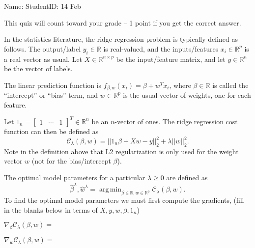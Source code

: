 \documentclass[12pt]{article}
\DeclareMathOperator*{\argmin}{arg\,min}
\begin{document}
\thispagestyle{empty}

Name: \underline{\hspace{2in}} StudentID: \underline{\hspace{2in}} 14 Feb

This quiz will count toward your grade -- 1 point if you get the
correct answer.

In the statistics literature, the ridge regression problem is
typically defined as follows. The
output/label $ y_i\in\mathbb R$ is real-valued, and the
inputs/features $x_i\in\mathbb R^p$ is a real vector as usual.
Let $X\in \mathbb R^{n\times p}$ be the input/feature matrix, and let
$ y\in\mathbb R^n$ be the vector of labels. 

The linear prediction function is
$f_{\beta,w}(x_i) = \beta + w^T x_i$, where $\beta\in\mathbb R$ is
called the ``intercept'' or ``bias'' term, and $w\in\mathbb R^p$ is
the usual vector of weights, one for each feature.

Let $1_n=\left[
  \begin{array}{ccc}
    1 &\cdots&1
  \end{array}
\right]^T\in\mathbb R^n$ be an $n$-vector of ones. The ridge
regression cost function can then be defined as
\begin{equation*}
  \mathcal C_\lambda(\beta, w) = ||1_n\beta + X w - y||_2^2 + \lambda ||w||_2^2.
\end{equation*}
Note in the definition above that L2 regularization is only used for
the weight vector $w$ (not for the bias/intercept $\beta$).

The optimal model parameters for a particular $\lambda\geq 0$ are
defined as
\begin{equation*}
  \hat \beta^\lambda, \hat w^\lambda = \argmin_{\beta\in\mathbb R, w\in\mathbb R^p}
\mathcal C_\lambda(\beta, w).
\end{equation*}
To find the optimal model parameters we must first compute the
gradients, (fill in the blanks below in terms of $X,y,w,\beta,1_n$)

\vskip 1in

$\nabla_\beta \mathcal C_\lambda(\beta, w)= $\underline{\hspace{2in}}

\vskip 1in

$\nabla_w \mathcal C_\lambda(\beta, w)= $\underline{\hspace{2in}}
\end{document}
